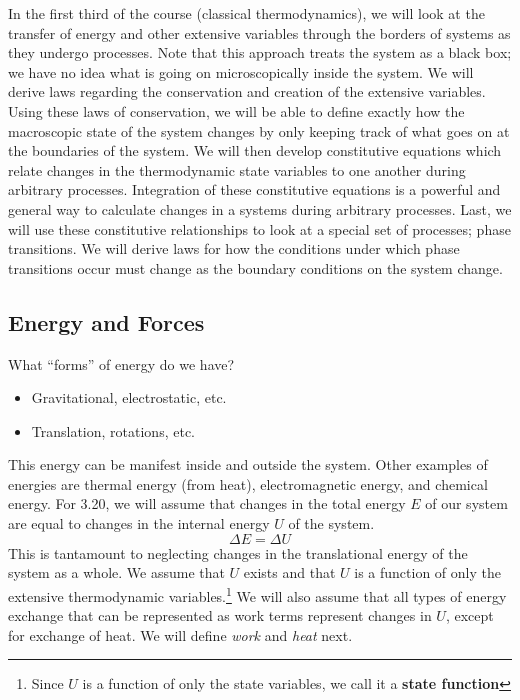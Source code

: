 \documentclass[12pt]{article}
\begin{document}
In the first third of the course (classical thermodynamics), we will look at the transfer of energy and other extensive variables through the borders of systems as they undergo processes. Note that this approach treats the system as a black box; we have no idea what is going on microscopically inside the system. We will derive laws regarding the conservation and creation of the extensive variables. Using these laws of conservation, we will be able to define exactly how the macroscopic state of the system changes by only keeping track of what goes on at the boundaries of the system. We will then develop constitutive equations which relate changes in the thermodynamic state variables to one another during arbitrary processes. Integration of these constitutive equations is a powerful and general way to calculate changes in a systems during arbitrary processes. Last, we will use these constitutive relationships to look at a special set of processes; phase transitions. We will derive laws for how the conditions under which phase transitions occur must change as the boundary conditions on the system change.

\subsection{Energy and Forces}
What ``forms'' of energy do we have?
\begin{itemize}
\item {} Gravitational, electrostatic, etc.
\item {} Translation, rotations, etc.  
\end{itemize}
This energy can be manifest inside and outside the system.  Other examples of energies are thermal energy (from heat), electromagnetic energy, and chemical energy.
For 3.20, we will assume that changes in the total energy $E$ of our system are equal to changes in the internal energy $U$ of the system.
\begin{equation}
\Delta E = \Delta U
\end{equation}
This is tantamount to neglecting changes in the translational energy of the system as a whole. We assume that $U$ exists and that $U$ is a function of only the extensive thermodynamic variables.\footnote{Since $U$ is a function of only the state variables, we call it a \textbf{state function}} %
We will also assume that all types of energy exchange that %
can be represented as work terms represent changes in $U$, except for exchange of heat. We will define \emph{work} and \emph{heat} next.
\end{document}
